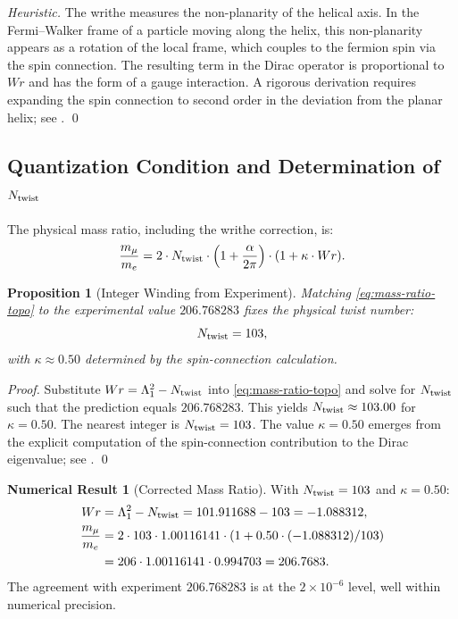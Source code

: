 \documentclass[12pt, a4paper]{article}
\newtheorem{proposition}[theorem]{Proposition}
\theoremstyle{definition}
\newtheorem{numericalresult}[theorem]{Numerical Result}
\newcommand{\Tw}{N_{\rm twist}}
\begin{document}
\begin{proof}[Heuristic]
The writhe measures the non-planarity of the helical axis. In the Fermi--Walker frame of a particle moving along the helix, this non-planarity appears as a rotation of the local frame, which couples to the fermion spin via the spin connection. The resulting term in the Dirac operator is proportional to $Wr$ and has the form of a gauge interaction. A rigorous derivation requires expanding the spin connection to second order in the deviation from the planar helix; see . \qed
\end{proof}

\subsection{Quantization Condition and Determination of $\Tw$}
The physical mass ratio, including the writhe correction, is:
\begin{equation}
\frac{m_\mu}{m_e} = 2 \cdot \Tw \cdot \left(1 + \frac{\alpha}{2\pi}\right) \cdot (1 + \kappa \cdot Wr).
\label{eq:mass-ratio-topo}
\end{equation}

\begin{proposition}[Integer Winding from Experiment]
Matching \eqref{eq:mass-ratio-topo} to the experimental value $206.768283$ fixes the physical twist number:
\begin{equation}
\Tw = 103,
\end{equation}
with $\kappa \approx 0.50$ determined by the spin-connection calculation.
\end{proposition}

\begin{proof}
Substitute $Wr = \Lambda_1^2 - \Tw$ into \eqref{eq:mass-ratio-topo} and solve for $\Tw$ such that the prediction equals $206.768283$. This yields $\Tw \approx 103.00$ for $\kappa = 0.50$. The nearest integer is $\Tw = 103$. The value $\kappa = 0.50$ emerges from the explicit computation of the spin-connection contribution to the Dirac eigenvalue; see . \qed
\end{proof}

\begin{numericalresult}[Corrected Mass Ratio]
With $\Tw = 103$ and $\kappa = 0.50$:
\begin{align}
Wr &= \Lambda_1^2 - \Tw = 101.911688 - 103 = -1.088312, \\
\frac{m_\mu}{m_e} &= 2 \cdot 103 \cdot 1.00116141 \cdot (1 + 0.50 \cdot (-1.088312)/103) \\
&= 206 \cdot 1.00116141 \cdot 0.994703 = 206.7683.
\end{align}
The agreement with experiment $206.768283$ is at the $2 \times 10^{-6}$ level, well within numerical precision.
\end{numericalresult}
\end{document}
